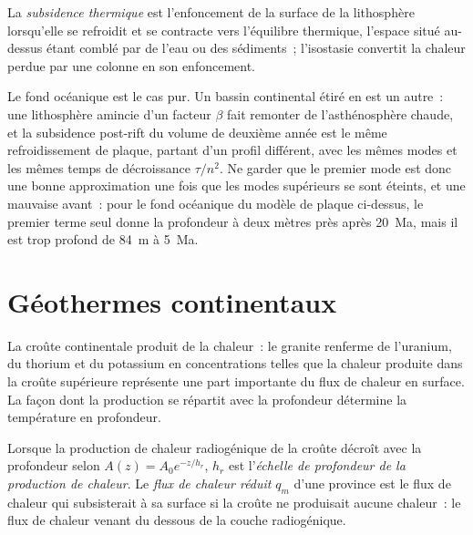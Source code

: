 \begin{definition}\label{def:b3:lithosphere-thermal-models:thermal-subsidence}
La \emph{subsidence thermique} est l'enfoncement de la
surface de la lithosphère lorsqu'elle se refroidit et se contracte vers l'équilibre
thermique, l'espace situé au-dessus étant comblé par de l'eau ou des sédiments~; l'isostasie
convertit la chaleur perdue par une colonne en son enfoncement.
\end{definition}

Le fond océanique est le cas pur. Un bassin continental étiré en est un autre~: une
lithosphère amincie d'un facteur $\beta$ fait remonter de l'asthénosphère chaude, et la
subsidence post-rift du volume de deuxième année est le même refroidissement de plaque, partant
d'un profil différent, avec les mêmes modes et les mêmes temps de décroissance $\tau/n^2$.
Ne garder que le premier mode est donc une bonne approximation une fois que les modes supérieurs
se sont éteints, et une mauvaise avant~: pour le fond océanique du modèle de plaque
ci-dessus, le premier terme seul donne la profondeur à deux mètres près après
\qty{20}{Ma}, mais il est trop profond de \qty{84}{m} à \qty{5}{Ma}.

\section{Géothermes continentaux}

La croûte continentale produit de la chaleur~: le granite renferme de l'uranium, du thorium et du potassium en
concentrations telles que la chaleur produite dans la croûte supérieure représente une part importante
du flux de chaleur en surface. La façon dont la production se répartit avec la profondeur
détermine la température en profondeur.

\begin{definition}\label{def:b3:lithosphere-thermal-models:reduced}
Lorsque la production de chaleur radiogénique de la croûte décroît avec la profondeur selon
$A(z) = A_0e^{-z/h_r}$, $h_r$ est l'\emph{échelle de profondeur de la production de
chaleur}. Le \emph{flux de chaleur
réduit} $q_m$ d'une province est le flux de chaleur qui subsisterait
à sa surface si la croûte ne produisait aucune chaleur~: le flux de chaleur venant du dessous de la
couche radiogénique.
\end{definition}

